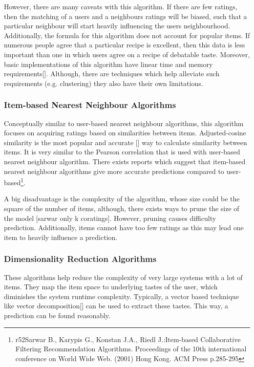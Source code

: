 However, there are many caveats with this algorithm. If there are few ratings, then the matching of a users and a neighbours ratings will be biased, such that a particular neighbour will start heavily influencing the users neighbourhood. Additionally, the formula for this algorithm does not account for popular items. If numerous people agree that a particular recipe is excellent, then this data is less important than one in which users agree on a recipe of debatable taste. Moreover, basic implementations of this algorithm have linear time and memory requirements[]. Although, there are techniques which help alleviate such requirements (e.g. clustering) they also have their own limitations.

\subsubsection{Item-based Nearest Neighbour Algorithms}

 Conceptually similar to user-based nearest neighbour algorithms, this algorithm focuses on acquiring ratings based on similarities between items. Adjusted-cosine similarity is the most popular and accurate [] way to calculate similarity between items. It is very similar to the Pearson correlation that is used with user-based nearest neighbour algorithm. There exists reports which suggest that item-based nearest neighbour algorithms give more accurate predictions compared to user-based\footnote{r52Sarwar B., Karypis G., Konstan J.A., Riedl J.:Item-based Collaborative Filtering Recommendation Algorithms. Proceedings of the 10th international conference on World Wide Web. (2001) Hong Kong. ACM Press p.285-295}.

A big disadvantage is the complexity of the algorithm, whose size could be the square of the number of items, although, there exists ways to prune the size of the model [sarwar only k coratings]. However, pruning causes difficulty prediction. Additionally, items cannot have too few ratings as this may lead one item to heavily influence a prediction.

\subsubsection{Dimensionality Reduction Algorithms}

These algorithms help reduce the complexity of very large systems with a lot of items. They map the item space to underlying tastes of the user, which diminishes the system runtime complexity. Typically, a vector based technique like vector decomposition[] can be used to extract these tastes. This way, a prediction can be found reasonably.

